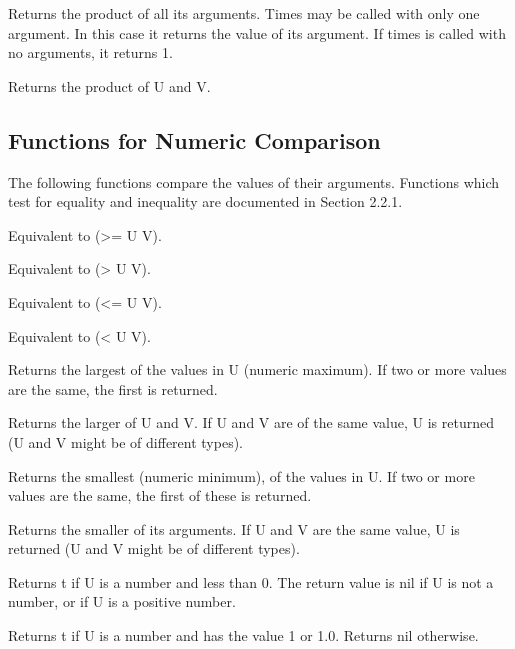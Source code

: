 {    Returns  the  product  of  all  its arguments.  Times may be
    called with only one argument.  In this case it returns  the
    value  of  its  argument.    If  times  is  called  with  no
    arguments, it returns 1.  }

{    Returns the product of U and V.
}
\subsection{Functions for Numeric Comparison}

  The following functions compare the values of their arguments.
Functions which test for equality and inequality are  documented
in Section 2.2.1.


{    Equivalent to (>= U V).  }

{    Equivalent to (> U V).  }

{    Equivalent to (<= U V).  }

{    Equivalent to (< U V).  }

{    Returns  the  largest  of the values in U (numeric maximum).
    If two or more  values are the same, the first is returned.  }

{    Returns the larger of U and V.  If U and V are of  the  same
    value, U is returned (U and  V might be of different types).  }

{    Returns  the smallest (numeric minimum), of the values in U.
    If two or more  values are the same, the first of  these  is
    returned.  }

{    Returns  the  smaller of its arguments.  If U and V are  the
    same value,  U is  returned  (U  and    V  might    be    of
    different types).  }

{    Returns  t  if  U  is  a number and less than 0.  The return
    value is nil if U is not a number, or if  U  is  a  positive
    number.  }

{    Returns  t if  U is a  number and  has the value  1 or  1.0.
    Returns nil otherwise.  }


